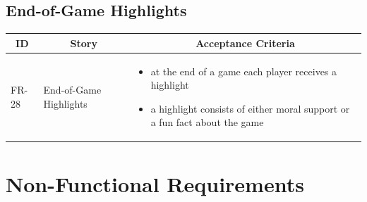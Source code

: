\subsection{End-of-Game Highlights}
\begin{tabular} { | m{1.25cm} | m{5.75cm} | m{6cm} | }
    \hline
    \multicolumn{1}{|c|}{ \textbf{ID}} & \multicolumn{1}{|c|}{ \textbf{Story} } & \multicolumn{1}{|c|}{ \textbf{Acceptance Criteria} } \\
    \hline
    FR-28 & End-of-Game Highlights & \begin{itemize}[-]
        \item at the end of a game each player receives a highlight
        \item a highlight consists of either moral support or a fun fact about the game
    \end{itemize}\\
    \hline
\end{tabular}

\section {Non-Functional Requirements}

\renewcommand{\arraystretch}{1.5}

